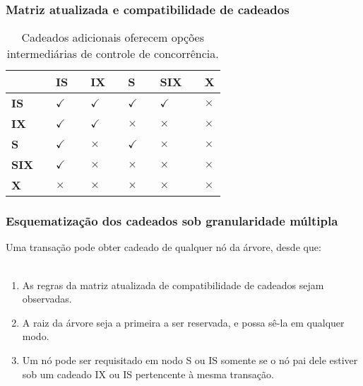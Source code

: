 \documentclass{beamer}
\begin{document}
\begin{frame}
    \frametitle{Matriz atualizada e compatibilidade de cadeados}

    \begin{table}
    \begin{tabular}{l l l l l l}
        \toprule

        \textbf{} && \textbf{IS} && \textbf{IX} && \textbf{S} && \textbf{SIX} && \textbf{X} \\

        \midrule

        \textbf{IS} && $\checkmark$ && $\checkmark$ && $\checkmark$ && $\checkmark$ && $\times$ \\
        \textbf{IX} && $\checkmark$ && $\checkmark$ && $\times$ && $\times$ && $\times$ \\
        \textbf{S} && $\checkmark$ && $\times$ && $\checkmark$ && $\times$ && $\times$ \\
        \textbf{SIX} && $\checkmark$ && $\times$ && $\times$ && $\times$ && $\times$ \\
        \textbf{X} && $\times$ && $\times$ && $\times$ && $\times$ && $\times$ \\

        \bottomrule
    \end{tabular}
    \caption{Cadeados adicionais oferecem opções intermediárias de controle de concorrência.}
    \end{table}
    
\end{frame}


\begin{frame}
    \frametitle{Esquematização dos cadeados sob granularidade múltipla}
    
    Uma transação pode obter cadeado de qualquer nó da árvore, desde que: \\~\\

    \begin{enumerate}
        \item As regras da matriz atualizada de compatibilidade de cadeados sejam observadas.
        \item A raiz da árvore seja a primeira a ser reservada, e possa sê-la em qualquer modo.
        \item Um nó pode ser requisitado em nodo S ou IS somente se o nó pai dele estiver sob um cadeado IX ou IS pertencente à mesma transação.
    \end{enumerate}
\end{frame}
        
\end{document}
